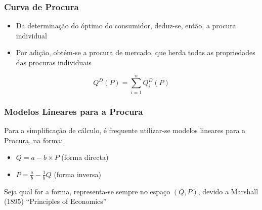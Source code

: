 \begin{frame}
\begin{center}
		\end{center}
\end{frame}

\begin{frame}
	\frametitle{Curva de Procura}
	\begin{itemize}
		\item Da determina\c c\~ao do \'optimo do consumidor, deduz-se, ent\~ao, a procura individual
		\item {\color{red} Por adi\c c\~ao}, obt\'em-se {\color{red}a procura de mercado}, que herda todas as propriedades das procuras individuais
	\end{itemize}
	\[Q^D(P)=\sum_{i=1}^n Q^D_i(P)\]
\end{frame}

\begin{frame}
	\frametitle{Modelos Lineares para a Procura}
	Para a simplifica\c c\~ao de c\'alculo, \'e frequente utilizar-se modelos lineares para a Procura, na forma:
	\begin{itemize}
		\item \(Q=a-b\times P\) (forma directa)
		\item \(P=\frac{a}{b}-\frac{1}{b}Q\) (forma inversa)
	\end{itemize}
	\vspace{1cm}
	{\small \color{red} Seja qual for a forma, representa-se sempre no espa\c co \((Q,P)\), devido a Marshall (1895) ``Principles of Economics''}
\end{frame}

